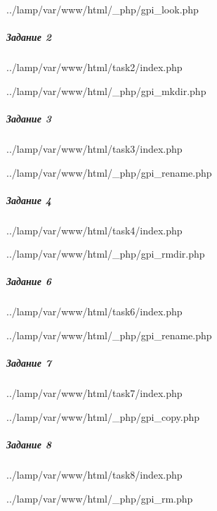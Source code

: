 
{../lamp/var/www/html/_php/gpi_look.php}


\subparagraph{Задание 2} \hspace{0pt}


{../lamp/var/www/html/task2/index.php}


{../lamp/var/www/html/_php/gpi_mkdir.php}


\subparagraph{Задание 3} \hspace{0pt}


{../lamp/var/www/html/task3/index.php}


{../lamp/var/www/html/_php/gpi_rename.php}


\subparagraph{Задание 4} \hspace{0pt}


{../lamp/var/www/html/task4/index.php}


{../lamp/var/www/html/_php/gpi_rmdir.php}


\subparagraph{Задание 6} \hspace{0pt}


{../lamp/var/www/html/task6/index.php}


{../lamp/var/www/html/_php/gpi_rename.php}


\subparagraph{Задание 7} \hspace{0pt}


{../lamp/var/www/html/task7/index.php}


{../lamp/var/www/html/_php/gpi_copy.php}


\subparagraph{Задание 8} \hspace{0pt}


{../lamp/var/www/html/task8/index.php}


{../lamp/var/www/html/_php/gpi_rm.php}

